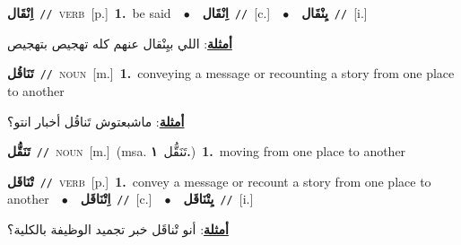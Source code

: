 \documentclass[10pt,a4paper,twoside]{article} %
\begin{document}
\begin{multicols}{2}
{\setlength\topsep{0pt}\textbf{\foreignlanguage{arabic}{اِنْقَال}}\ {\color{gray}\texttt{//}\color{black}}\ \textsc{verb}\ [p.]\ \textbf{1.}~be said\ \ $\bullet$\ \ \setlength\topsep{0pt}\textbf{\foreignlanguage{arabic}{اِنْقَال}}\ {\color{gray}\texttt{//}\color{black}}\ [c.]\ \ $\bullet$\ \ \setlength\topsep{0pt}\textbf{\foreignlanguage{arabic}{يِنْقَال}}\ {\color{gray}\texttt{//}\color{black}}\ [i.]\  \begin{flushright}\color{gray}\foreignlanguage{arabic}{\textbf{\underline{\foreignlanguage{arabic}{أمثلة}}}: اللي بيِنْقال عنهم كله تهجيص بتهجيص}\end{flushright}\color{black}} \vspace{2mm}

{\setlength\topsep{0pt}\textbf{\foreignlanguage{arabic}{تَنَاقُل}}\ {\color{gray}\texttt{//}\color{black}}\ \textsc{noun}\ [m.]\ \textbf{1.}~conveying a message or recounting a story from one place to another\  \begin{flushright}\color{gray}\foreignlanguage{arabic}{\textbf{\underline{\foreignlanguage{arabic}{أمثلة}}}: ماشبعتوش تَناقُل أخبار انتو؟}\end{flushright}\color{black}} \vspace{2mm}

{\setlength\topsep{0pt}\textbf{\foreignlanguage{arabic}{تَنَقُّل}}\ {\color{gray}\texttt{//}\color{black}}\ \textsc{noun}\ [m.]\ \color{gray}(msa. \foreignlanguage{arabic}{تَنَقُّل}~\foreignlanguage{arabic}{\textbf{١.}})\color{black}\ \textbf{1.}~moving from one place to another\ } \vspace{2mm}

{\setlength\topsep{0pt}\textbf{\foreignlanguage{arabic}{تْنَاقَل}}\ {\color{gray}\texttt{//}\color{black}}\ \textsc{verb}\ [p.]\ \textbf{1.}~convey a message or recount a story from one place to another\ \ $\bullet$\ \ \setlength\topsep{0pt}\textbf{\foreignlanguage{arabic}{اِتْنَاقَل}}\ {\color{gray}\texttt{//}\color{black}}\ [c.]\ \ $\bullet$\ \ \setlength\topsep{0pt}\textbf{\foreignlanguage{arabic}{يِتْنَاقَل}}\ {\color{gray}\texttt{//}\color{black}}\ [i.]\  \begin{flushright}\color{gray}\foreignlanguage{arabic}{\textbf{\underline{\foreignlanguage{arabic}{أمثلة}}}: أنو تْناقَل خبر تجميد الوظيفة بالكلية؟}\end{flushright}\color{black}} \vspace{2mm}


\end{multicols}
\end{document}
